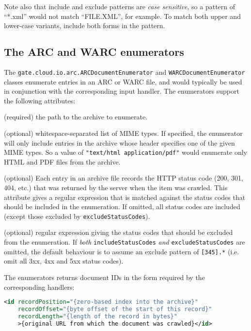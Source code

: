 Note also that include and exclude patterns are {\em case sensitive}, so a
pattern of ``*.xml'' would not match ``FILE.XML'', for example.  To match both
upper and lower-case variants, include both forms in the pattern.

\subsection{The ARC and WARC enumerators}

The \verb!gate.cloud.io.arc.ARCDocumentEnumerator! and
\verb!WARCDocumentEnumerator! classes enumerate entries in an
ARC or WARC file, and would typically be used in conjunction with the
corresponding input handler.  The enumerators support the following attributes:

\bde
\item[srcFile] (required) the path to the archive to enumerate.
\item[mimeTypes] (optional) whitespace-separated list of MIME types.  If
  specified, the enumerator will only include entries in the archive whose
  header specifies one of the given MIME types.  So a value of
  \verb!"text/html application/pdf"! would enumerate only HTML and PDF files
  from the archive.
\item[includeStatusCodes] (optional) Each entry in an archive file records the
  HTTP status code (200, 301, 404, etc.) that was returned by the server when
  the item was crawled.  This attribute gives a regular expression that is
  matched against the status codes that should be included in the enumeration.
  If omitted, all status codes are included (except those excluded by
  \verb!excludeStatusCodes!).
\item[excludeStatusCodes] (optional) regular expression giving the status codes
  that should be excluded from the enumeration.  If {\em both}
  \verb!includeStatusCodes! {\em and} \verb!excludeStatusCodes! are omitted,
  the default behaviour is to assume an exclude pattern of \verb![345].*! (i.e.
  omit all 3xx, 4xx and 5xx status codes).
\ede

The enumerators returns document IDs in the form required by the corresponding
handlers:

\begin{lstlisting}[language=XML]
<id recordPosition="{zero-based index into the archive}"
    recordOffset="{byte offset of the start of this record}"
    recordLength="{length of the record in bytes}"
    >{original URL from which the document was crawled}</id>
\end{lstlisting}

